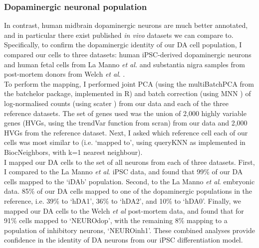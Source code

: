 \subsubsection{Dopaminergic neuronal population}

In contrast, human midbrain dopaminergic neurons are much better annotated, and in particular there exist published \textit{in vivo} datasets we can compare to.
Specifically, to confirm the dopaminergic identity of our DA cell population, I compared our cells to three datasets: human iPSC-derived dopaminergic neurons and human fetal cells from La Manno \textit{et al.} \cite{la2016molecular} and substantia nigra samples from post-mortem donors from Welch \textit{et al}. \cite{welch2019single}. 
\\

To perform the mapping, I performed joint PCA (using the multiBatchPCA from the batchelor package, implemented in R) 
and batch correction (using MNN \cite{haghverdi2018batch}) of log-normalised counts (using scater \cite{mccarthy2017scater}) from our data and each of the three reference datasets. 
The set of genes used was the union of 2,000 highly variable genes (HVGs, using the trendVar function from scran) 
from our data and 2,000 HVGs from the reference dataset. 
Next, I asked which reference cell each of our cells was most similar to (i.e. ‘mapped to', using queryKNN as implemented in BiocNeighbors, with k=1 nearest neighbour).\\

I mapped our DA cells to the set of all neurons from each of three datasets.
First, I compared to the La Manno \textit{et al}. iPSC data, and found that
99\% of our DA cells mapped to the `iDAb' population.
Second, to the La Manno \textit{et al}. embryonic data. 
85\% of our DA cells mapped to one of the dopaminergic populations in the reference, i.e. 39\% to `hDA1', 36\% to `hDA2', and 10\% to `hDA0'.
Finally, we mapped our DA cells to the Welch \textit{et al} post-mortem data, and found that for 91\% cells mapped to `NEUROdop', with the remaining 8\% mapping to a population of inhibitory neurons, `NEUROinh1'.
These combined analyses provide confidence in the identity of DA neurons from our iPSC differentiation model.

